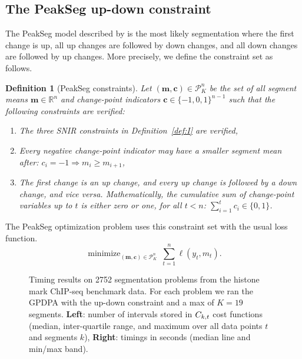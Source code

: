 \documentclass{article}
\newtheorem{definition}{Definition}
\DeclareMathOperator*{\minimize}{minimize}
\newcommand{\RR}{\mathbb R}
\begin{document}
\subsection{The PeakSeg up-down constraint}
\label{sec:PeakSeg}

The PeakSeg model described by \citet{HOCKING-PeakSeg} is the most
likely segmentation where the first change is up, all up changes are
followed by down changes, and all down changes are followed by up
changes. More precisely, we define the constraint set as follows.
\begin{definition}[PeakSeg constraints]
  \label{def:U}
  Let $(\mathbf m, \mathbf c)\in\mathcal P_K^n$ be the set of all
  segment means $\mathbf m\in\RR^n$ and change-point indicators
  $\mathbf c\in\{-1, 0,1\}^{n-1}$ such that the following constraints
  are verified:
  \begin{enumerate}
  \item The three SNIR constraints in Definition~\ref{def:I} are verified,
  \item Every negative change-point indicator may have a smaller
    segment mean after:
    $c_i = -1 \Rightarrow m_i \geq m_{i+1}$,
  \item The first change is an up change, and every up change is followed by a
    down change, and vice versa. Mathematically, the cumulative sum of
    change-point variables up to $t$ is either zero or one, for all $t<n$:
    $\sum_{i=1}^t c_i \in \{0, 1\}$.
  \end{enumerate}
\end{definition}
The PeakSeg optimization problem uses this constraint set with the usual loss function. 
\begin{equation}
\label{eq:min_PeakSeg}
    \minimize_{
        (\mathbf m, \mathbf c)\in\mathcal P^n_K
      } \ 
\sum_{t=1}^n \ell(y_t, m_t).
\end{equation}

\begin{figure}[b!]
  \centering
  \parbox{0.49\textwidth}{
    
  }
  \parbox{0.49\textwidth}{
    
  }
  \vskip -0.5cm
  \caption{Timing results on 2752 segmentation problems from the
    histone mark ChIP-seq benchmark data. For each problem we ran the
    GPDPA with the up-down constraint and a max of $K=19$
    segments.  \textbf{Left}: number of intervals stored in
    $C_{k,t}$ cost functions (median, inter-quartile range, and
    maximum over all data points $t$ and segments $k$),
    \textbf{Right}: timings in seconds (median line and min/max
    band).}
  \label{fig:timings}
\end{figure}
\end{document}
